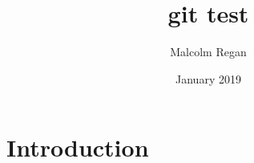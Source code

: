 \documentclass{article}
\title{git test}
\author{Malcolm Regan}
\date{January 2019}
\begin{document}
\maketitle

\section{Introduction}
\end{document}
